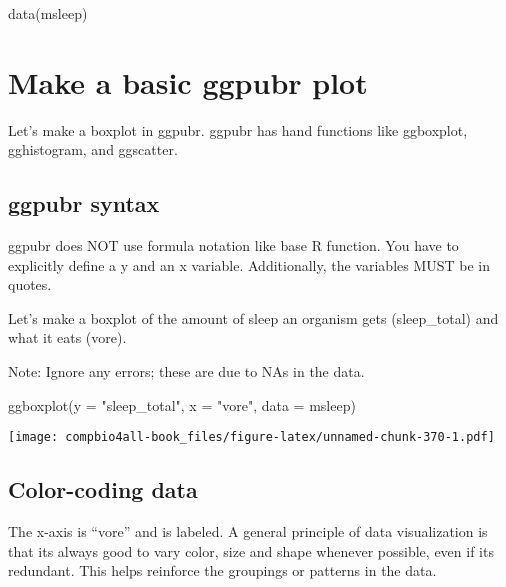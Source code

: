 \documentclass[
]{book}
\newenvironment{Shaded}{\begin{snugshade}}{\end{snugshade}}
\newcommand{\AttributeTok}[1]{\textcolor[rgb]{0.77,0.63,0.00}{#1}}
\newcommand{\FunctionTok}[1]{\textcolor[rgb]{0.00,0.00,0.00}{#1}}
\newcommand{\NormalTok}[1]{#1}
\newcommand{\StringTok}[1]{\textcolor[rgb]{0.31,0.60,0.02}{#1}}
\begin{document}
\begin{Shaded}
\begin{Highlighting}[]
\FunctionTok{data}\NormalTok{(msleep)}
\end{Highlighting}
\end{Shaded}

\hypertarget{make-a-basic-ggpubr-plot-1}{%
\section{Make a basic ggpubr plot}\label{make-a-basic-ggpubr-plot-1}}

Let's make a boxplot in ggpubr. ggpubr has hand functions like ggboxplot, gghistogram, and ggscatter.

\hypertarget{ggpubr-syntax-2}{%
\subsection{ggpubr syntax}\label{ggpubr-syntax-2}}

ggpubr does NOT use formula notation like base R function. You have to explicitly define a y and an x variable. Additionally, the variables MUST be in quotes.

Let's make a boxplot of the amount of sleep an organism gets (sleep\_total) and what it eats (vore).

Note: Ignore any errors; these are due to NAs in the data.

\begin{Shaded}
\begin{Highlighting}[]
\FunctionTok{ggboxplot}\NormalTok{(}\AttributeTok{y =} \StringTok{"sleep\_total"}\NormalTok{,}
          \AttributeTok{x =} \StringTok{"vore"}\NormalTok{,}
          \AttributeTok{data =}\NormalTok{ msleep)}
\end{Highlighting}
\end{Shaded}

\texttt{[image: compbio4all-book\_files/figure-latex/unnamed-chunk-370-1.pdf]}

\hypertarget{color-coding-data-1}{%
\subsection{Color-coding data}\label{color-coding-data-1}}

The x-axis is ``vore'' and is labeled. A general principle of data visualization is that its always good to vary color, size and shape whenever possible, even if its redundant. This helps reinforce the groupings or patterns in the data.
\end{document}
